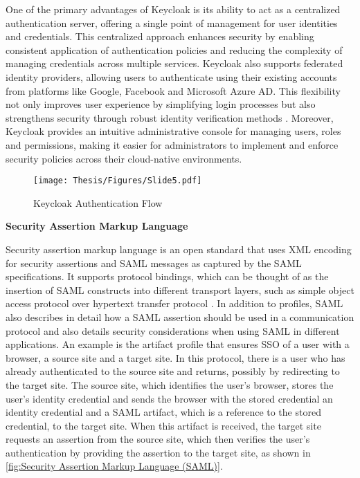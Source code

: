 One of the primary advantages of Keycloak is its ability to act as a centralized authentication server, offering a single point of management for user identities and credentials. This centralized approach enhances security by enabling consistent application of authentication policies and reducing the complexity of managing credentials across multiple services. Keycloak also supports federated identity providers, allowing users to authenticate using their existing accounts from platforms like Google, Facebook and Microsoft Azure AD. This flexibility not only improves user experience by simplifying login processes but also strengthens security through robust identity verification methods \cite{keycloak_doc}. Moreover, Keycloak provides an intuitive administrative console for managing users, roles and permissions, making it easier for administrators to implement and enforce security policies across their cloud-native environments.


\captionsetup{justification=centering}
\begin{figure}[h]
\centering
\texttt{[image: Thesis/Figures/Slide5.pdf]}
\caption{\label{fig:Authentication}Keycloak Authentication Flow \cite{r45}}
\end{figure}



\textbf{Security Assertion Markup Language}

Security assertion markup language  is an open standard that uses XML encoding for security assertions and SAML messages as captured by the SAML specifications. It supports protocol bindings, which can be thought of as the insertion of SAML constructs into different transport layers, such as simple object access protocol  over hypertext transfer protocol . In addition to profiles, SAML also describes in detail how a SAML assertion should be used in a communication protocol and also details security considerations when using SAML in different applications. An example is the artifact profile that ensures SSO of a user with a browser, a source site and a target site. In this protocol, there is a user who has already authenticated to the source site and returns, possibly by redirecting to the target site. The source site, which identifies the user's browser, stores the user's identity credential and sends the browser with the stored credential an identity credential and a SAML artifact, which is a reference to the stored credential, to the target site. When this artifact is received, the target site requests an assertion from the source site, which then verifies the user's authentication by providing the assertion to the target site, as shown in \autoref{fig:Security Assertion Markup Language (SAML)}. \cite{gross2003security}



